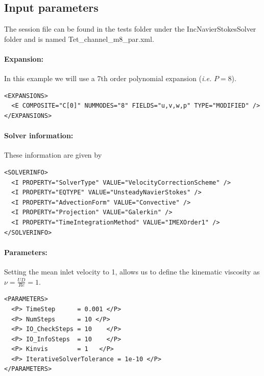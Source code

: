 \subsection{Input parameters}
The session file can be found in the tests folder under the IncNavierStokesSolver folder and is named Tet\_channel\_m8\_par.xml.

\paragraph{Expansion:~} In this example we will use a 7th order polynomial expansion (\textit{i.e.} $P=8$).
\begin{lstlisting}[style=XMLStyle]
<EXPANSIONS>
  <E COMPOSITE="C[0]" NUMMODES="8" FIELDS="u,v,w,p" TYPE="MODIFIED" />
</EXPANSIONS>
\end{lstlisting}

\paragraph{Solver information:~} These information are given by
\begin{lstlisting}[style=XMLStyle]
<SOLVERINFO>
  <I PROPERTY="SolverType" VALUE="VelocityCorrectionScheme" />
  <I PROPERTY="EQTYPE" VALUE="UnsteadyNavierStokes" />
  <I PROPERTY="AdvectionForm" VALUE="Convective" />
  <I PROPERTY="Projection" VALUE="Galerkin" />
  <I PROPERTY="TimeIntegrationMethod" VALUE="IMEXOrder1" />
</SOLVERINFO>
\end{lstlisting}

\paragraph{Parameters:~} Setting the mean inlet velocity to 1, allows us to define the kinematic viscosity as $\nu = \frac{UD}{Re}=1$.
\begin{lstlisting}[style=XMLStyle]
<PARAMETERS>
  <P> TimeStep      = 0.001 </P>
  <P> NumSteps      = 10 </P>
  <P> IO_CheckSteps = 10    </P>
  <P> IO_InfoSteps  = 10    </P>
  <P> Kinvis        = 1   </P>
  <P> IterativeSolverTolerance = 1e-10 </P>
</PARAMETERS>
\end{lstlisting}

